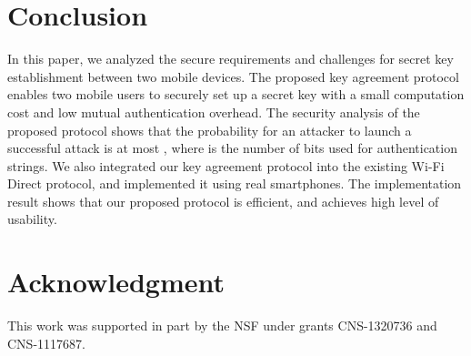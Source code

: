 \documentclass[conference]{IEEEtran}
\begin{document}
 






\section{Conclusion \label{sec5}}

In this paper, we analyzed the secure requirements and challenges for secret key establishment between two mobile devices. The proposed key agreement protocol enables two mobile users to securely set up a secret key with a small computation cost and low mutual authentication overhead. The security analysis of the proposed protocol shows that the probability for an attacker to launch a successful attack is at most , where  is the number of bits used for authentication strings. We also integrated our key agreement protocol into the existing Wi-Fi Direct protocol, and implemented it using real smartphones. The implementation result shows that our proposed protocol is efficient, and achieves high level of usability.
 
\section*{Acknowledgment}
This work was supported in part by the NSF under grants CNS-1320736 and CNS-1117687.
\end{document}
